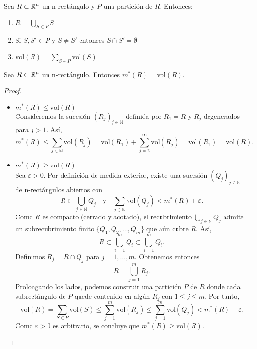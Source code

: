 \begin{lema}
    Sea $R \subset \mathbb{R}^n$ un n-rectángulo y $P$ una partición de $R$. Entonces:
    \vspace{-0.5em}
    \begin{enumerate}
        \item $R = \bigcup_{S \in P} S$
        \item Si $S, S' \in P$ y $S \neq S'$ entonces $S \cap S' = \emptyset$
        \item $\text{vol}(R) = \sum_{S \in P} \text{vol}(S)$
    \end{enumerate}
\end{lema}

\begin{proposición}
Sea $R \subset \mathbb{R}^n$ un n-rectángulo. Entonces $m^*(R) = \text{vol}(R)$.
\end{proposición}

\begin{proof}
    \leavevmode
    \begin{itemize}
        \item $m^*(R) \leq \text{vol}(R)$\\
              Consideremos la sucesión $(R_j)_{j \in \mathbb{N}}$ definida por $R_1 = R$ y $R_j$ degenerados para $j > 1$. Así,
              \[
                  m^*(R) \leq \sum_{j \in \mathbb{N}} \text{vol}(R_j) = \text{vol}(R_1) + \sum_{j=2}^{\infty} \text{vol}(R_j) = \text{vol}(R_1) = \text{vol}(R).
              \]
        \item $m^*(R) \geq \text{vol}(R)$\\
              Sea $\varepsilon > 0$. Por definición de medida exterior, existe una sucesión $(Q_j)_{j \in \mathbb{N}}$ de n-rectángulos abiertos con
              \[
                  R \subset \bigcup_{j \in \mathbb{N}} Q_j \quad \text{y} \quad \sum_{j \in \mathbb{N}} \text{vol}(Q_j) < m^*(R) + \varepsilon.
              \]
              Como $R$ es compacto (cerrado y acotado), el recubrimiento $\bigcup_{j \in
                      \mathbb{N}} Q_j$ admite un subrecubrimiento finito $\{Q_1, Q_2, \ldots, Q_m\}$
              que aún cubre $R$. Así,
              \[
                  R \subset \bigcup_{i=1}^m Q_i \subset \bigcup_{i=1}^m \overline{Q}_i.
              \]
              Definimos $R_j = R \cap \overline{Q}_j$ para $j = 1, \ldots, m$. Obtenemos
              entonces
              \[
                  R = \bigcup_{j=1}^m R_j.
              \]
              Prolongando los lados, podemos construir una partición $P$ de $R$ donde cada
              subrectángulo de $P$ quede contenido en algún $R_j$ con $1 \leq j \leq m$. Por
              tanto,
              \[
                  \text{vol}(R) = \sum_{S \in P} \text{vol}(S) \leq \sum_{j=1}^m \text{vol}(R_j) \leq \sum_{j=1}^m \text{vol}(Q_j) < m^*(R) + \varepsilon.
              \]
              Como $\varepsilon > 0$ es arbitrario, se concluye que $m^*(R) \geq
                  \text{vol}(R)$.
    \end{itemize}
\end{proof}

